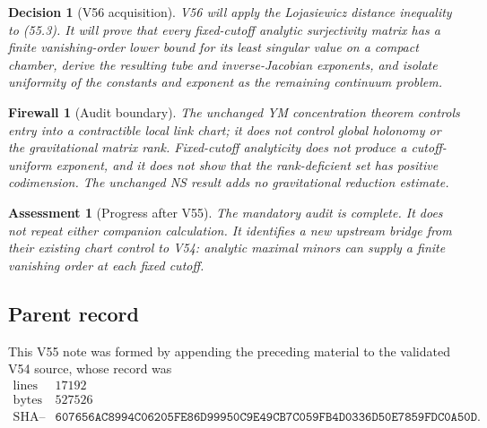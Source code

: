 \documentclass[11pt]{article}
\newtheorem{assessment}[theorem]{Assessment}
\newtheorem{firewall}[theorem]{Firewall}
\newtheorem{decision}[theorem]{Decision}
\begin{document}
\begin{decision}[V56 acquisition]
\label{dec:v11v55-next}
V56 will apply the Lojasiewicz distance inequality to (55.3).  It will
prove that every fixed-cutoff analytic surjectivity matrix has a
finite vanishing-order lower bound for its least singular value on a
compact chamber, derive the resulting tube and inverse-Jacobian
exponents, and isolate uniformity of the constants and exponent as the
remaining continuum problem.
\end{decision}

\begin{firewall}[Audit boundary]
\label{fire:v11v55-boundary}
The unchanged YM concentration theorem controls entry into a
contractible local link chart; it does not control global holonomy or
the gravitational matrix rank.  Fixed-cutoff analyticity does not
produce a cutoff-uniform exponent, and it does not show that the
rank-deficient set has positive codimension.  The unchanged NS result
adds no gravitational reduction estimate.
\end{firewall}

\begin{assessment}[Progress after V55]
\label{ass:v11v55-status}
The mandatory audit is complete.  It does not repeat either companion
calculation.  It identifies a new upstream bridge from their existing
chart control to V54: analytic maximal minors can supply a finite
vanishing order at each fixed cutoff.
\end{assessment}

\subsection{Parent record}

This V55 note was formed by appending the preceding material to the
validated V54 source, whose record was
\[
\begin{array}{c|c}
\text{lines}&17192\\
\text{bytes}&527526\\
\text{SHA--256}&
\texttt{607656AC8994C06205FE86D99950C9E49CB7C059FB4D0336D50E7859FDC0A50D}.
\end{array}                                                     \tag{55.4}
\]

\end{document}

